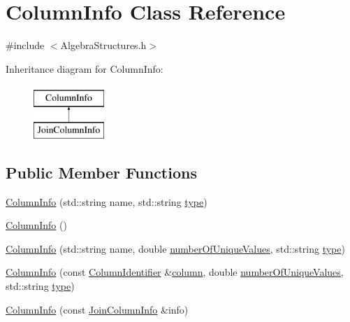 \hypertarget{class_column_info}{\section{Column\+Info Class Reference}
\label{class_column_info}
}


{\ttfamily \#include $<$Algebra\+Structures.\+h$>$}

Inheritance diagram for Column\+Info\+:\begin{figure}[H]
\begin{center}
\leavevmode
\includegraphics[height=2.000000cm]{class_column_info}
\end{center}
\end{figure}
\subsection*{Public Member Functions}
\begin{DoxyCompactItemize}
\item 
\hyperlink{class_column_info_a1068047ba3c85b84076e69619f64123a}{Column\+Info} (std\+::string name, std\+::string \hyperlink{class_column_info_add303d9d4415fc18b790d9a904831c29}{type})
\item 
\hyperlink{class_column_info_a12b2dd59f7b6c13008291c3ef03ba7f4}{Column\+Info} ()
\item 
\hyperlink{class_column_info_ae8dc9720185a9312e3b33b2ecb92ba7e}{Column\+Info} (std\+::string name, double \hyperlink{class_column_info_add402bfa7bed26aa6072c5da9b06dda9}{number\+Of\+Unique\+Values}, std\+::string \hyperlink{class_column_info_add303d9d4415fc18b790d9a904831c29}{type})
\item 
\hyperlink{class_column_info_a64cd8f7c77b3fe41434b85b05fa88344}{Column\+Info} (const \hyperlink{class_column_identifier}{Column\+Identifier} \&\hyperlink{class_column_info_a13c87a82665272f3eb3e18a8323d0d7e}{column}, double \hyperlink{class_column_info_add402bfa7bed26aa6072c5da9b06dda9}{number\+Of\+Unique\+Values}, std\+::string \hyperlink{class_column_info_add303d9d4415fc18b790d9a904831c29}{type})
\item 
\hyperlink{class_column_info_af5487ed1e204fe47f66414f7570eb649}{Column\+Info} (const \hyperlink{class_join_column_info}{Join\+Column\+Info} \&info)
\end{DoxyCompactItemize}
